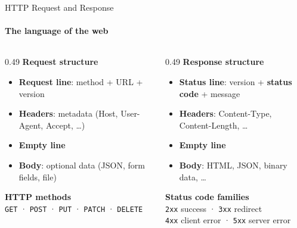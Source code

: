 \documentclass[aspectratio=169]{beamer}
\begin{document}
\begin{frame}[t]{HTTP Request and Response}
\framesubtitle{The language of the web}
\vspace*{-0.4cm}
\begin{columns}[T,onlytextwidth]
    \begin{column}{0.49\textwidth}
        \textbf{Request structure}
        \begin{itemize}
            \item \textbf{Request line}: method + URL + version
            \item \textbf{Headers}: metadata (Host, User-Agent, Accept, \ldots)
            \item \textbf{Empty line}
            \item \textbf{Body}: optional data (JSON, form fields, file)
        \end{itemize}
        \vspace{2mm}
        \textbf{HTTP methods}\\
        \texttt{GET} · \texttt{POST} · \texttt{PUT} · \texttt{PATCH} · \texttt{DELETE}
    \end{column}
    \begin{column}{0.49\textwidth}
        \textbf{Response structure}
        \begin{itemize}
            \item \textbf{Status line}: version + \textbf{status code} + message
            \item \textbf{Headers}: Content-Type, Content-Length, \ldots
            \item \textbf{Empty line}
            \item \textbf{Body}: HTML, JSON, binary data, \ldots
        \end{itemize}
        \vspace{2mm}
        \textbf{Status code families}\\
        \texttt{2xx} success · \texttt{3xx} redirect\\
        \texttt{4xx} client error · \texttt{5xx} server error
    \end{column}
\end{columns}
\end{frame}
\end{document}
